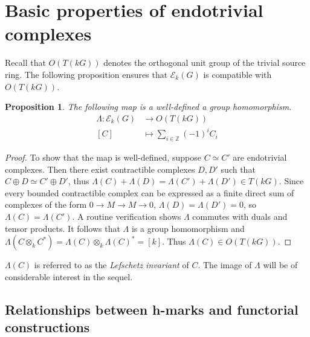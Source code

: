 \documentclass[10pt,letterpaper, boxed, cm]{amsart}
\newcommand{\Z}{\mathbb{Z}}
\newcommand{\calE}{\mathcal{E}}
\newtheorem{prop}[theorem]{Proposition}
\theoremstyle{remark}
\theoremstyle{definition}
\begin{document}
	\section{Basic properties of endotrivial complexes} \label{basicpropsofendotrivs}

	Recall that $O(T(kG))$ denotes the orthogonal unit group of the trivial source ring. The following proposition ensures that $\calE_k(G)$ is compatible with $O(T(kG))$.

	\begin{prop}
		The following map is a well-defined a group homomorphism.
		\begin{align*}
		\Lambda: \calE_k(G) &\to O(T(kG))\\
		[C] &\mapsto \sum_{i \in \Z}(-1)^i C_i
		\end{align*}
	\end{prop}
	\begin{proof}
		To show that the map is well-defined, suppose $C\simeq C'$ are endotrivial complexes. Then there exist contractible complexes $D, D'$ such that $C \oplus D \simeq C' \oplus D'$, thus $\Lambda(C) + \Lambda(D) = \Lambda(C') + \Lambda(D') \in T(kG)$. Since every bounded contractible complex can be expressed as a finite direct sum of complexes of the form $0 \to M \to M \to 0$, $\Lambda(D) = \Lambda(D') = 0$, so $\Lambda(C) = \Lambda(C')$. A routine verification shows $\Lambda$ commutes with duals and tensor products. It follows that $\Lambda$ is a group homomorphism and  $\Lambda(C\otimes_k C^*) = \Lambda(C)\otimes_k \Lambda(C)^* = [k]$. Thus $\Lambda(C) \in O(T(kG))$.
	\end{proof}

	$\Lambda(C)$ is referred to as the \textit{Lefschetz invariant} of $C$. The image of $\Lambda$ will be of considerable interest in the sequel.

	\subsection{Relationships between h-marks and functorial constructions}
\end{document}
